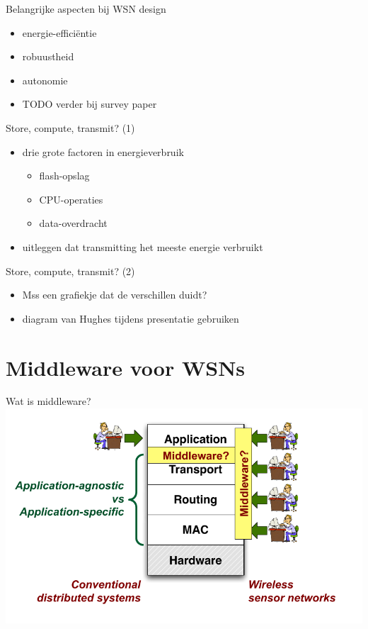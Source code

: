 \documentclass[presentation, bigger]{beamer}
\begin{document}
\begin{frame}[label=sec-1-6]{Belangrijke aspecten bij WSN design}
\begin{itemize}
\item energie-efficiëntie
\item robuustheid
\item autonomie
\item TODO verder bij survey paper
\end{itemize}
\end{frame}

\begin{frame}[label=sec-1-7]{Store, compute, transmit? (1)}
\begin{itemize}
\item drie grote factoren in energieverbruik
\begin{itemize}
\item flash-opslag
\item CPU-operaties
\item data-overdracht
\end{itemize}
\item uitleggen dat transmitting het meeste energie verbruikt
\end{itemize}
\end{frame}

\begin{frame}[label=sec-1-8]{Store, compute, transmit? (2)}
\begin{itemize}
\item Mss een grafiekje dat de verschillen duidt?
\item diagram van Hughes tijdens presentatie gebruiken
\end{itemize}
\end{frame}
\section{Middleware voor WSNs}
\label{sec-2}
\begin{frame}[label=sec-2-1]{Wat is middleware?}
\includegraphics[width=\textwidth,keepaspectration=true]{middleware}
\end{frame}
\end{document}
